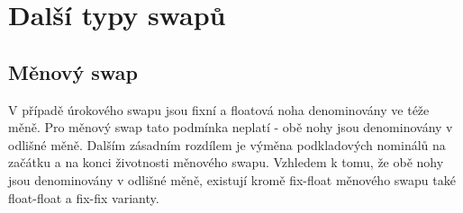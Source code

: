 \documentclass[a4paper]{book}
\begin{document}
\section{Další typy swapů}

\subsection{Měnový swap}

V případě úrokového swapu jsou fixní a floatová noha denominovány ve téže měně. Pro měnový swap tato podmínka neplatí - obě nohy jsou denominovány v odlišné měně. Dalším zásadním rozdílem je výměna podkladových nominálů na začátku a na konci životnosti měnového swapu. Vzhledem k tomu, že obě nohy jsou denominovány v odlišné měně, existují kromě fix-float měnového swapu také float-float a fix-fix varianty.
\end{document}
